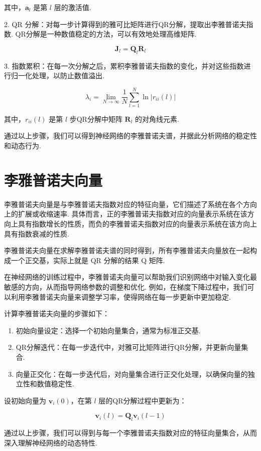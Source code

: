 其中，\(\mathbf{a}_l\) 是第 \(l\) 层的激活值. 

2. QR 分解：对每一步计算得到的雅可比矩阵进行QR分解，提取出李雅普诺夫指数. QR分解是一种数值稳定的方法，可以有效地处理高维矩阵. 

\[ \mathbf{J}_l = \mathbf{Q}_l \mathbf{R}_l \]

3. 指数累积：在每一次分解之后，累积李雅普诺夫指数的变化，并对这些指数进行归一化处理，以防止数值溢出. 

\[ \lambda_i = \lim_{N \to \infty} \frac{1}{N} \sum_{l=1}^N \ln |r_{ii}(l)| \]

其中，\(r_{ii}(l)\) 是第 \(l\) 步QR分解中矩阵 \(\mathbf{R}_l\) 的对角线元素. 

通过以上步骤，我们可以得到神经网络的李雅普诺夫谱，并据此分析网络的稳定性和动态行为. 

\section{李雅普诺夫向量}

李雅普诺夫向量是与李雅普诺夫指数对应的特征向量，它们描述了系统在各个方向上的扩展或收缩速率. 具体而言，正的李雅普诺夫指数对应的向量表示系统在该方向上具有指数增长的性质，而负的李雅普诺夫指数对应的向量表示系统在该方向上具有指数衰减的性质. 

李雅普诺夫向量在求解李雅普诺夫谱的同时得到，所有李雅普诺夫向量放在一起构成一个正交基，实际上就是 QR 分解的结果 Q 矩阵.

在神经网络的训练过程中，李雅普诺夫向量可以帮助我们识别网络中对输入变化最敏感的方向，从而指导网络参数的调整和优化. 例如，在梯度下降过程中，我们可以利用李雅普诺夫向量来调整学习率，使得网络在每一步更新中更加稳定. 

计算李雅普诺夫向量的步骤如下：

\begin{enumerate}

\item 初始向量设定：选择一个初始向量集合，通常为标准正交基. 
   
\item QR分解迭代：在每一步迭代中，对雅可比矩阵进行QR分解，并更新向量集合. 
   
\item 向量正交化：在每一步迭代后，对向量集合进行正交化处理，以确保向量的独立性和数值稳定性. 

\end{enumerate}

设初始向量为 \(\mathbf{v}_i(0)\)，在第 \(l\) 层的QR分解过程中更新为：

\[ \mathbf{v}_i(l) = \mathbf{Q}_l \mathbf{v}_i(l-1) \]

通过以上步骤，我们可以得到与每一个李雅普诺夫指数对应的特征向量集合，从而深入理解神经网络的动态特性. 